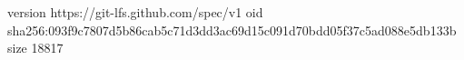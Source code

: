 version https://git-lfs.github.com/spec/v1
oid sha256:093f9c7807d5b86cab5c71d3dd3ac69d15c091d70bdd05f37c5ad088e5db133b
size 18817
